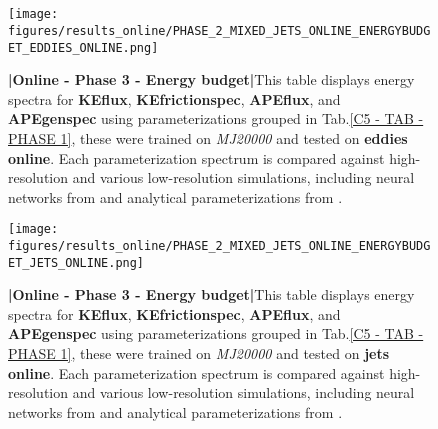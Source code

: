 %
%
\newpage
\thispagestyle{empty}
\part{}
\newpage

%
%
\newpage

\begin{figure}[H]
    \centering
    \texttt{[image: figures/results\_online/PHASE\_2\_MIXED\_JETS\_ONLINE\_ENERGYBUDGET\_EDDIES\_ONLINE.png]}
    \caption{\textbf{|}\textcolor{section_color}{\textbf{Online - Phase 3 - Energy budget}}\textbf{|}This table displays energy spectra for \textbf{KEflux}, \textbf{KEfrictionspec}, \textbf{APEflux}, and \textbf{APEgenspec} using parameterizations grouped in Tab.\ref{C5 - TAB - PHASE 1}, these were trained on \textit{MJ20000}  and tested on \textbf{eddies online}. Each parameterization spectrum is compared against high-resolution and various low-resolution simulations, including neural networks from \cite{Benchmarking} and analytical parameterizations from \cite{ClosureAnalytical2, ClosureAnalytical51, ClosureDataDrivenZanna}.
}
    \label{APP - ONLINE - PHASE 3 - ENERGY BUDGET -  JETS MIXED 20000 and EDDIES ONLINE}
\end{figure}

\newpage


\begin{figure}[H]
    \centering
    \texttt{[image: figures/results\_online/PHASE\_2\_MIXED\_JETS\_ONLINE\_ENERGYBUDGET\_JETS\_ONLINE.png]}
    \caption{\textbf{|}\textcolor{section_color}{\textbf{Online - Phase 3 - Energy budget}}\textbf{|}This table displays energy spectra for \textbf{KEflux}, \textbf{KEfrictionspec}, \textbf{APEflux}, and \textbf{APEgenspec} using parameterizations grouped in Tab.\ref{C5 - TAB - PHASE 1}, these were trained on \textit{MJ20000}  and tested on \textbf{jets online}. Each parameterization spectrum is compared against high-resolution and various low-resolution simulations, including neural networks from \cite{Benchmarking} and analytical parameterizations from \cite{ClosureAnalytical2, ClosureAnalytical51, ClosureDataDrivenZanna}.
}
    \label{APP - ONLINE - PHASE 3 - ENERGY BUDGET -  JETS MIXED 20000 and JETS ONLINE}
\end{figure}

